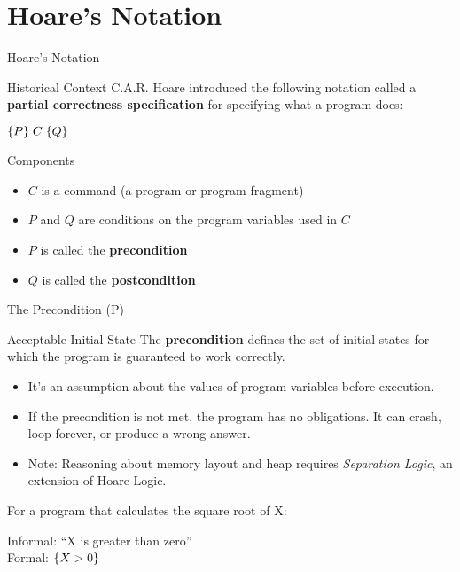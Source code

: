 \section{Hoare's Notation}

\begin{frame}{Hoare's Notation}
    \begin{block}{Historical Context}
        C.A.R. Hoare introduced the following notation called a \textbf{partial correctness specification} for specifying what a program does:
        \begin{center}
            \Large $\{P\}\; C\; \{Q\}$
        \end{center}
    \end{block}
    
    \begin{block}{Components}
        \begin{itemize}
            \item $C$ is a command (a program or program fragment)
            \item $P$ and $Q$ are conditions on the program variables used in $C$
            \item $P$ is called the \textbf{precondition}
            \item $Q$ is called the \textbf{postcondition}
        \end{itemize}
    \end{block}
\end{frame}

\begin{frame}{The Precondition (P)}
    \begin{block}{Acceptable Initial State}
        The \textbf{precondition} defines the set of initial states for which the program is guaranteed to work correctly.
        \begin{itemize}
            \item It's an assumption about the values of program variables before execution.
            \item If the precondition is not met, the program has no obligations. It can crash, loop forever, or produce a wrong answer.
            \item Note: Reasoning about memory layout and heap requires \emph{Separation Logic}, an extension of Hoare Logic.
        \end{itemize}
    \end{block}

    \begin{example}
        For a program that calculates the square root of X:
        \begin{center}
            Informal: ``X is greater than zero''\\
            Formal: $\{X > 0\}$
        \end{center}
    \end{example}
\end{frame}

